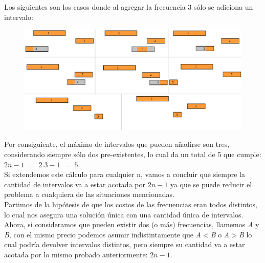 Los siguientes son los casos donde al agregar la frecuencia $3$ s\'olo se adiciona un intervalo:
  \begin{figure}[h!]
   \begin{center}
 	\includegraphics[scale=0.2]{imagenes/ej2/secuencias/Paso2/todos1.png}
   \end{center}
 \end{figure}

Por consiguiente, el m\'aximo de intervalos que pueden a\~nadirse son tres, considerando siempre s\'olo dos pre-existentes, lo cual da un total de 5 que cumple: $2n-1$ $=$ $2$.$3-1$ $=$ $5$.\\


Si extendemos este c\'alculo para cualquier n, vamos a concluir que siempre la cantidad de intervalos va a estar acotada por $2n-1$ ya que se puede reducir el problema a cualquiera de las situaciones mencionadas.\\%


Partimos de la hip\'otesis de que los costos de las frecuencias eran todos distintos, lo cual nos asegura una soluci\'on \'unica con una cantidad \'unica de intervalos. Ahora, si consideramos que pueden existir dos (o m\'as) frecuencias, llamemos \emph{A} y \emph{B}, con el mismo precio podemos asumir indistintamente que \emph{A$<$B} o \emph{A$>$B} lo cual podr\'ia devolver intervalos distintos, pero siempre su cantidad va a estar acotada por lo mismo probado anteriormente: $2n-1$.\\

